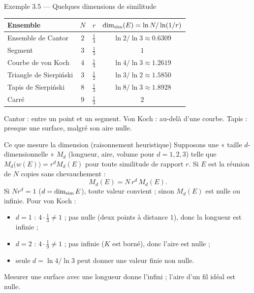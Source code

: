 \begin{frame}{Exemple 3.5 --- Quelques dimensions de similitude}
  \begin{center}
  \small
  \begin{tabular}{lccc}
    \toprule
    Ensemble & $N$ & $r$ & $\dim_{\mathrm{sim}}(E) = \ln N/\ln(1/r)$ \\
    \midrule
    Ensemble de Cantor & $2$ & $\tfrac13$ & $\ln2/\ln3 \approx \num{0.6309}$ \\
    Segment & $3$ & $\tfrac13$ & $1$ \\
    Courbe de von Koch & $4$ & $\tfrac13$ & $\ln4/\ln3 \approx \num{1.2619}$ \\
    Triangle de Sierpiński & $3$ & $\tfrac12$ & $\ln3/\ln2 \approx \num{1.5850}$ \\
    Tapis de Sierpiński & $8$ & $\tfrac13$ & $\ln8/\ln3 \approx \num{1.8928}$ \\
    Carré & $9$ & $\tfrac13$ & $2$ \\
    \bottomrule
  \end{tabular}
  \end{center}
  \small Cantor : entre un point et un segment. Von Koch : au-delà d'une
  courbe. Tapis : presque une surface, malgré son aire nulle.
\end{frame}

\begin{frame}{Ce que mesure la dimension (raisonnement heuristique)}
  \small Supposons une « taille $d$-dimensionnelle » $M_d$ (longueur,
  aire, volume pour $d=1,2,3$) telle que $M_d\big(w(E)\big) = r^d M_d(E)$
  pour toute similitude de rapport $r$. Si $E$ est la réunion de $N$
  copies sans chevauchement :
  \[
    M_d(E) = N\,r^d\,M_d(E).
  \]
  Si $Nr^d=1$ ($d=\dim_{\mathrm{sim}} E$), toute valeur convient ; sinon $M_d(E)$ est
  nulle ou infinie. Pour von Koch :
  \begin{itemize}
    \item $d=1$ : $4\cdot\tfrac13\neq1$ ; pas nulle (deux points à
      distance $1$), donc la longueur est infinie ;
    \item $d=2$ : $4\cdot\tfrac19\neq1$ ; pas infinie ($K$ est borné),
      donc l'aire est nulle ;
    \item seule $d=\ln4/\ln3$ peut donner une valeur finie non nulle.
  \end{itemize}
  Mesurer une surface avec une longueur donne l'infini ; l'aire d'un fil
  idéal est nulle.
\end{frame}

